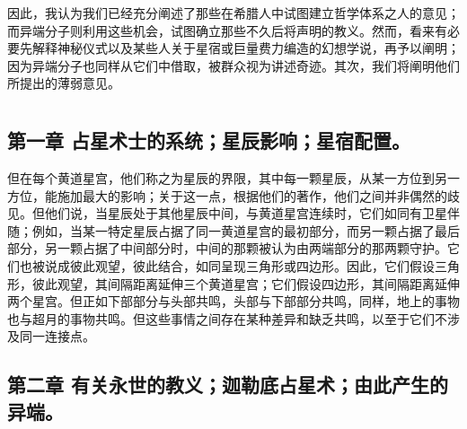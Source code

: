 因此，我认为我们已经充分阐述了那些在希腊人中试图建立哲学体系之人的意见；而异端分子则利用这些机会，试图确立那些不久后将声明的教义。然而，看来有必要先解释神秘仪式以及某些人关于星宿或巨量费力编造的幻想学说，再予以阐明；因为异端分子也同样从它们中借取，被群众视为讲述奇迹。其次，我们将阐明他们所提出的薄弱意见。\par

\par



\section{}


\subsection{第一章 占星术士的系统；星辰影响；星宿配置。}

但在每个黄道星宫，他们称之为星辰的界限，其中每一颗星辰，从某一方位到另一方位，能施加最大的影响；关于这一点，根据他们的著作，他们之间并非偶然的歧见。但他们说，当星辰处于其他星辰中间，与黄道星宫连续时，它们如同有卫星伴随；例如，当某一特定星辰占据了同一黄道星宫的最初部分，而另一颗占据了最后部分，另一颗占据了中间部分时，中间的那颗被认为由两端部分的那两颗守护。它们也被说成彼此观望，彼此结合，如同呈现三角形或四边形。因此，它们假设三角形，彼此观望，其间隔距离延伸三个黄道星宫；它们假设四边形，其间隔距离延伸两个星宫。但正如下部部分与头部共鸣，头部与下部部分共鸣，同样，地上的事物也与超月的事物共鸣。但这些事情之间存在某种差异和缺乏共鸣，以至于它们不涉及同一连接点。\par


\subsection{第二章 有关永世的教义；迦勒底占星术；由此产生的异端。}

